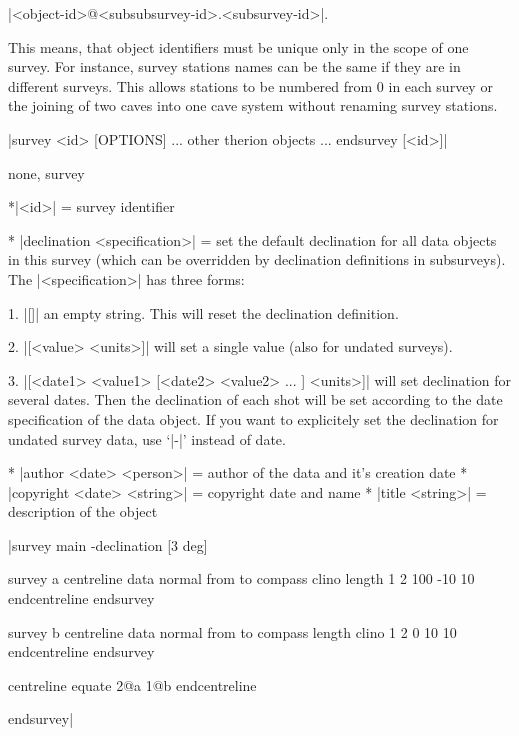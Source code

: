   |<object-id>@<subsubsurvey-id>.<subsurvey-id>|.
  
  This means, that object identifiers must be unique only in the scope of one 
  survey. For instance, survey stations names can be the same if they are 
  in different surveys. This allows stations to be numbered from 0 in each survey or 
  the joining of two caves into one cave system without renaming survey stations.

\enddescription

\syntax
      |survey <id> [OPTIONS]
       ... other therion objects ...
       endsurvey [<id>]|
\endsyntax

\context
  none, survey
\endcontext

\arguments
*|<id>| = survey identifier
\endarguments

\options 
* |declination <specification>| = set the default declination for 
  all data objects in this survey (which can be overridden by
  declination definitions in subsurveys). The |<specification>| 
  has three forms:

  1. |[]| an empty string. This will reset the declination definition.

  2. |[<value> <units>]| will set a single value (also for undated surveys).

  3. |[<date1> <value1> [<date2> <value2> ... ] <units>]| 
     will set declination for several dates. Then the declination
     of each shot will be set according to the date specification
     of the data object. If you want to explicitely set the declination
     for undated survey data, use `|-|' instead of date.

* |author <date> <person>| = author of the data and it's creation date
* |copyright <date> <string>| = copyright date and name
* |title <string>| = description of the object
\endoptions

\example

|survey main -declination [3 deg]

  survey a
    centreline
      data normal from to compass clino length
      1 2 100 -10 10
    endcentreline
  endsurvey

  survey b
    centreline
      data normal from to compass length clino
      1 2 0 10 10
    endcentreline
  endsurvey

  centreline
    equate 2@a 1@b
  endcentreline

endsurvey|
\endexample      



